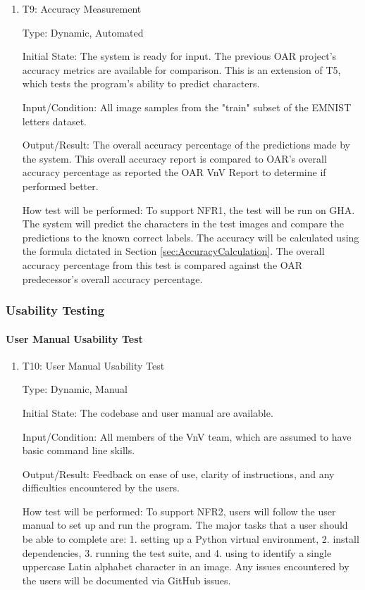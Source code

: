 \documentclass[12pt, titlepage]{article}
\begin{document}
\begin{enumerate}

\item{T9: Accuracy Measurement\\}

Type: Dynamic, Automated

Initial State: The \progname{} system is ready for input. The previous
OAR project's accuracy metrics are available for comparison. This is an
extension of T5, which tests the program's ability to predict characters.

Input/Condition: All image samples from the "train" subset of the EMNIST letters
dataset.

Output/Result: The overall accuracy percentage of the predictions made by the
\progname{} system. This overall accuracy report is compared to OAR's overall
accuracy percentage as reported the OAR VnV Report to determine if \progname{}
performed better.

How test will be performed: To support NFR1, the test will be run on GHA. The
system will predict the characters in the test images and compare the
predictions to the known correct labels. The accuracy will be calculated using
the formula dictated in Section \ref{sec:AccuracyCalculation}. The overall accuracy percentage from
this test is compared against the OAR predecessor's overall accuracy percentage.

\end{enumerate}

\subsubsection{Usability Testing}

\paragraph{User Manual Usability Test}

\begin{enumerate}

\item{T10: User Manual Usability Test\\}

Type: Dynamic, Manual
					
Initial State: The codebase and user manual are available.
					
Input/Condition: All members of the VnV team, which are assumed to have basic
command line skills.
					
Output/Result: Feedback on ease of use, clarity of instructions, and any
difficulties encountered by the users.
					
How test will be performed: To support NFR2, users will follow the user manual
to set up and run the \progname{} program. The major tasks that a user should be
able to complete are: 1. setting up a Python virtual environment, 2. install
dependencies, 3. running the test suite, and 4. using \progname{} to identify a
single uppercase Latin alphabet character in an image. Any issues encountered by
the users will be documented via GitHub issues.
\end{enumerate}
\end{document}
